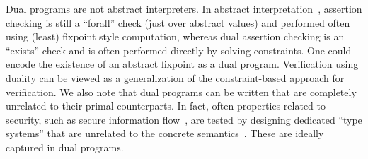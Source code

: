 \documentclass[preprint]{sig-alternate-05-2015}
\begin{document}
Dual programs are not abstract interpreters. In abstract interpretation~\cite{CousotCousot77:POPL},
assertion checking is still a ``forall'' check (just over abstract values) and performed
often using (least) fixpoint style computation,
whereas dual assertion checking is an ``exists'' check and is often performed directly
by solving constraints.  One could encode the existence of an abstract fixpoint as a 
dual program.  Verification using duality can be viewed as a  generalization of the 
constraint-based approach for verification.  We also note that dual programs
can be written that are completely unrelated to their primal counterparts.
In fact, often properties related to security, such as
secure information flow~\cite{DBLP:journals/cacm/DenningD77,DBLP:journals/jsac/SabelfeldM03},
are tested by designing 
dedicated ``type systems'' that are unrelated
to the concrete semantics~\cite{DBLP:conf/csfw/Smith01,DBLP:conf/csfw/MalozemoffKG14}.
These are ideally captured in dual programs.
\end{document}
